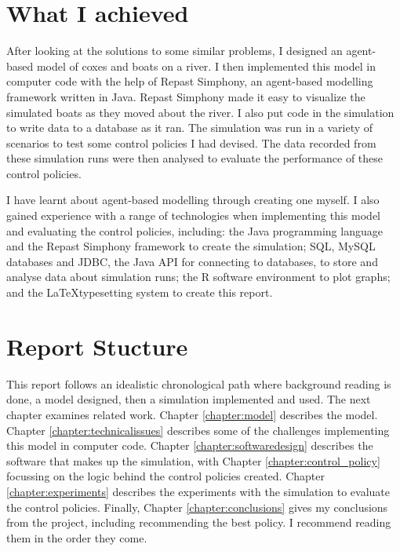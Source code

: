   \section{What I achieved}
  After looking at the solutions to some similar problems, I designed an agent-based model of coxes and boats on a river. I then implemented this model in computer code with the help of Repast Simphony, an agent-based modelling framework written in Java. Repast Simphony made it easy to visualize the simulated boats as they moved about the river. I also put code in the simulation to write data to a database as it ran. The simulation was run in a variety of scenarios to test some control policies I had devised. The data recorded from these simulation runs were then analysed to evaluate the performance of these control policies.
  
  I have learnt about agent-based modelling through creating one myself. I also gained experience with a range of technologies when implementing this model and evaluating the control policies, including: the Java programming language and the Repast Simphony framework to create the simulation; SQL, MySQL databases and JDBC, the Java API for connecting to databases, to store and analyse data about simulation runs; the R software environment to plot graphs; and the \LaTeX typesetting system to create this report.
  
  \section{Report Stucture}
  This report follows an idealistic chronological path where background reading is done, a model designed, then a simulation implemented and used. The next chapter examines related work. Chapter \ref{chapter:model} describes the model. Chapter \ref{chapter:technicalissues} describes some of the challenges implementing this model in computer code. Chapter \ref{chapter:softwaredesign} describes the software that makes up the simulation, with Chapter \ref{chapter:control_policy} focussing on the logic behind the control policies created. Chapter \ref{chapter:experiments} describes the experiments with the simulation to evaluate the control policies. Finally, Chapter \ref{chapter:conclusions} gives my conclusions from the project, including recommending the best policy. I recommend reading them in the order they come.
